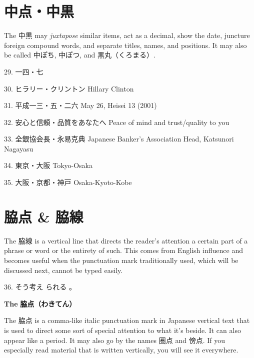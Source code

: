 \section{中点・中黒}
 
\par{ The 中黒 may \emph{juxtapose }similar items, act as a decimal, show the date, juncture foreign compound words, and separate titles, names, and positions. It may also be called 中ぽち, 中ぽつ, and 黒丸（くろまる）. }

\par{29. 一四・七 \hfill{} }

\par{30. ヒラリー・クリントン \hfill\break
Hillary Clinton }

\par{31. 平成一三・五・二六 \hfill\break
May 26, Heisei 13 (2001) }

\par{32. 安心と信頼・品質をあなたへ \hfill\break
Peace of mind and trust\slash quality to you }

\par{33. 全銀協会長・永易克典 \hfill\break
Japanese Banker's Association Head, Katsunori Nagayasu }

\par{34. 東京・大阪 \hfill\break
Tokyo-Osaka }

\par{35. 大阪・京都・神戸 \hfill\break
Osaka-Kyoto-Kobe }
      
\section{脇点 \& 脇線}
 
\par{ The 脇線 is a vertical line that directs the reader's attention a certain part of a phrase or word or the entirety of such. This comes from English influence and becomes useful when the punctuation mark traditionally used, which will be discussed next, cannot be typed easily. }

\par{36. そう考え られる 。 }

\begin{center}
 \textbf{The }\textbf{脇点（わきてん） }
\end{center}

\par{The 脇点 is a comma-like italic punctuation mark in Japanese vertical text that is used to direct some sort of special attention to what it's beside. It can also appear like a period. It may also go by the names 圏点 and 傍点. If you especially read material that is written vertically, you will see it everywhere. }
      
